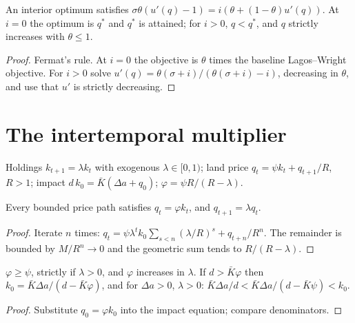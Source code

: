\begin{theorem}
\label{thm:lw_kalai}
\leanok
{}
An interior optimum satisfies $\sigma\theta(u'(q)-1)=i(\theta+(1-\theta)u'(q))$. At $i=0$ the optimum is $q^*$ and
$q^*$ is attained; for $i>0$, $q<q^*$, and $q$ strictly increases with $\theta\le1$.
\end{theorem}
\begin{proof}
\leanok
Fermat's rule. At $i=0$ the objective is $\theta$ times the baseline Lagos--Wright objective. For $i>0$ solve
$u'(q)=\theta(\sigma+i)/(\theta(\sigma+i)-i)$, decreasing in $\theta$, and use that $u'$ is strictly decreasing.
\end{proof}

\section{The intertemporal multiplier}

\begin{definition}
\label{def:dkm}
\leanok
Holdings $k_{t+1}=\lambda k_t$ with exogenous $\lambda\in[0,1)$; land price $q_t=\psi k_t+q_{t+1}/R$, $R>1$;
impact $d\,k_0=\bar K(\Delta a+q_0)$; $\varphi=\psi R/(R-\lambda)$.
\end{definition}

\begin{theorem}
\label{thm:dkm_price}
\leanok
{}
Every bounded price path satisfies $q_t=\varphi k_t$, and $q_{t+1}=\lambda q_t$.
\end{theorem}
\begin{proof}
\leanok
Iterate $n$ times: $q_t=\psi\lambda^t k_0\sum_{s<n}(\lambda/R)^s+q_{t+n}/R^n$. The remainder is bounded by $M/R^n\to0$ and
the geometric sum tends to $R/(R-\lambda)$.
\end{proof}

\begin{theorem}
\label{thm:dkm_amp}
\leanok
{}
$\varphi\ge\psi$, strictly if $\lambda>0$, and $\varphi$ increases in $\lambda$. If $d>\bar K\varphi$ then
$k_0=\bar K\Delta a/(d-\bar K\varphi)$, and for $\Delta a>0$, $\lambda>0$:
$\bar K\Delta a/d<\bar K\Delta a/(d-\bar K\psi)<k_0$.
\end{theorem}
\begin{proof}
\leanok
Substitute $q_0=\varphi k_0$ into the impact equation; compare denominators.
\end{proof}

